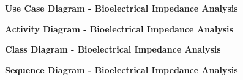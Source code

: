 \documentclass{article}
\begin{document}
		\begin{figure}[htbp]
			\textbf{Use Case Diagram - Bioelectrical Impedance Analysis}
			\centering
			\begin{subfigure}{\textwidth}
				\resizebox{\textwidth}{!}{}
			\end{subfigure}
			\begin{subfigure}{\textwidth}
				
			\end{subfigure}
		\end{figure}
		\clearpage
		
		\begin{figure}[htbp]
			\textbf{Activity Diagram - Bioelectrical Impedance Analysis}
			\centering
			\begin{subfigure}{\textwidth}
				\centering
				\scalebox{1.0}{}
			\end{subfigure}
			\begin{subfigure}{\textwidth}
				
			\end{subfigure}
		\end{figure}
		\clearpage
		
		\begin{figure}[htbp]
			\textbf{Class Diagram - Bioelectrical Impedance Analysis}
			\centering
			\begin{subfigure}{\textwidth}
				\resizebox{\textwidth}{!}{}
			\end{subfigure}
			\begin{subfigure}{\textwidth}
				
			\end{subfigure}
		\end{figure}
		\clearpage
		
		\begin{figure}[htbp]
			\textbf{Sequence Diagram - Bioelectrical Impedance Analysis}
			\centering
			\begin{subfigure}{\textwidth}
				\centering
				\scalebox{0.7}{}
			\end{subfigure}
			\begin{subfigure}{\textwidth}
				
			\end{subfigure}
		\end{figure}
		\clearpage   
\end{document}
